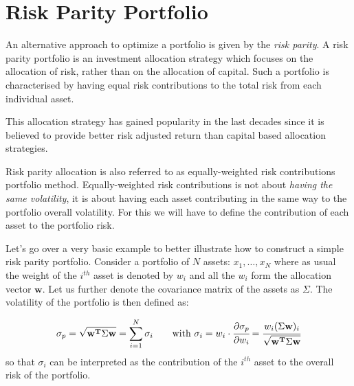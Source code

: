 \section{Risk Parity Portfolio}
\label{risk-parity-portfolio}

An alternative approach to optimize a portfolio is given by the \emph{risk parity}. A risk parity portfolio is an investment allocation strategy which focuses on the allocation of risk, rather than on the allocation of capital. 
Such a portfolio is characterised by having equal risk contributions to the total risk from each individual asset. 

This allocation strategy has gained popularity in the last decades since it is believed to provide better risk adjusted return than capital based allocation strategies.

Risk parity allocation is also referred to as equally-weighted risk contributions portfolio method. Equally-weighted risk contributions is not about \emph{having the same volatility}, it is about having each asset contributing in the same way to the portfolio overall volatility. For this we will have to define the contribution of each asset to the portfolio risk. 

Let's go over a very basic example to better illustrate how to construct a simple risk parity portfolio. Consider a portfolio of \(N\) assets: \(x_{1}, \ldots, x_N\) where as usual the weight of the $i^{th}$ asset is denoted by \(w_{i}\) and all the \(w_{i}\) form the allocation vector \(\mathbf{w}\). Let us further denote the covariance matrix of the assets as \(\Sigma\). The volatility of the portfolio is then defined as:

\begin{equation} 
\sigma_p={\sqrt {\mathbf{w^T}\Sigma \mathbf{w}}} = \sum_{i=1}^{N}\sigma _{i}\qquad\textrm{with}~\sigma _{i} = w_{i}\cdot \cfrac{\partial\sigma_p}{\partial w_{i}}={\cfrac {w_{i}(\Sigma \mathbf{w})_{i}}{\sqrt {\mathbf{w^T}\Sigma \mathbf{w}}}}
\end{equation}
so that \(\sigma _{i}\) can be interpreted as the contribution of the $i^{th}$ asset to the overall risk of the portfolio.

